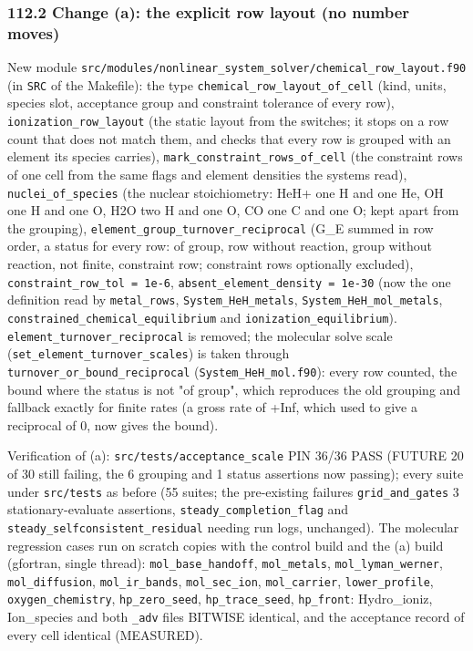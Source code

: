 \documentclass[english,a4paper]{my_memo}
\begin{document}
\subsubsection{112.2 Change (a): the explicit row layout (no number moves)}\label{1122-change-a-the-explicit-row-layout-no-number-moves}

New module \texttt{src/modules/nonlinear\_system\_solver/chemical\_row\_layout.f90}
(in \texttt{SRC} of the Makefile): the type \texttt{chemical\_row\_layout\_of\_cell} (kind,
units, species slot, acceptance group and constraint tolerance of every row),
\texttt{ionization\_row\_layout} (the static layout from the switches; it stops on a
row count that does not match them, and checks that every row is grouped with
an element its species carries), \texttt{mark\_constraint\_rows\_of\_cell} (the
constraint rows of one cell from the same flags and element densities the
systems read), \texttt{nuclei\_of\_species} (the nuclear stoichiometry: HeH+ one H and
one He, OH one H and one O, H2O two H and one O, CO one C and one O; kept
apart from the grouping), \texttt{element\_group\_turnover\_reciprocal} (G\_E summed in
row order, a status for every row: of group, row without reaction, group
without reaction, not finite, constraint row; constraint rows optionally
excluded), \texttt{constraint\_row\_tol\ =\ 1e-6}, \texttt{absent\_element\_density\ =\ 1e-30}
(now the one definition read by \texttt{metal\_rows}, \texttt{System\_HeH\_metals},
\texttt{System\_HeH\_mol\_metals}, \texttt{constrained\_chemical\_equilibrium} and
\texttt{ionization\_equilibrium}). \texttt{element\_turnover\_reciprocal} is removed; the
molecular solve scale (\texttt{set\_element\_turnover\_scales}) is taken through
\texttt{turnover\_or\_bound\_reciprocal} (\texttt{System\_HeH\_mol.f90}): every row counted, the
bound where the status is not "of group", which reproduces the old grouping
and fallback exactly for finite rates (a gross rate of +Inf, which used to
give a reciprocal of 0, now gives the bound).

Verification of (a): \texttt{src/tests/acceptance\_scale} PIN 36/36 PASS (FUTURE 20 of
30 still failing, the 6 grouping and 1 status assertions now passing); every
suite under \texttt{src/tests} as before (55 suites; the pre-existing failures
\texttt{grid\_and\_gates} 3 stationary-evaluate assertions, \texttt{steady\_completion\_flag}
and \texttt{steady\_selfconsistent\_residual} needing run logs, unchanged). The
molecular regression cases run on scratch copies with the control build and
the (a) build (gfortran, single thread): \texttt{mol\_base\_handoff}, \texttt{mol\_metals},
\texttt{mol\_lyman\_werner}, \texttt{mol\_diffusion}, \texttt{mol\_ir\_bands}, \texttt{mol\_sec\_ion},
\texttt{mol\_carrier}, \texttt{lower\_profile}, \texttt{oxygen\_chemistry}, \texttt{hp\_zero\_seed},
\texttt{hp\_trace\_seed}, \texttt{hp\_front}: Hydro\_ioniz, Ion\_species and both \texttt{\_adv} files
BITWISE identical, and the acceptance record of every cell identical (MEASURED).
\end{document}
